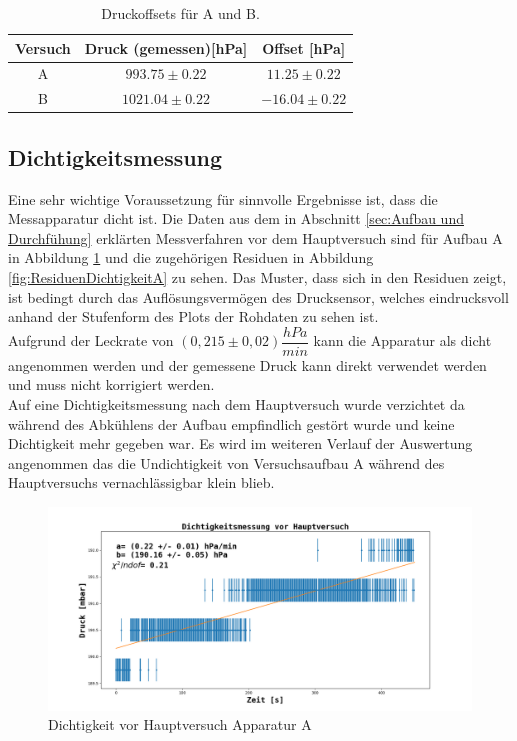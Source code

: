 \documentclass[12pt,a4paper]{article}
\begin{document}
\begin{table}
\begin{center}
\begin{tabular}{|c|c|c|}
\hline
Versuch & Druck (gemessen)[hPa] & Offset [hPa]\\
\hline
A & $993.75 \pm 0.22$ & $11.25 \pm 0.22$\\
\hline
B & $1021.04 \pm 0.22$ & $-16.04 \pm 0.22$\\
\hline
\end{tabular}
\end{center}
\caption[Offsets]{Druckoffsets für A und B.}
\label{tab:Druckoffsets}
\end{table}







\subsection{Dichtigkeitsmessung}
Eine sehr wichtige Voraussetzung für sinnvolle Ergebnisse ist, dass die Messapparatur dicht ist. Die Daten aus dem in Abschnitt \ref{sec:Aufbau und Durchfühung} erklärten Messverfahren vor dem Hauptversuch sind für Aufbau A in Abbildung \ref{fig:DichtigkeitA} und die zugehörigen Residuen in Abbildung \ref{fig:ResiduenDichtigkeitA} zu sehen. Das Muster, dass sich in den Residuen zeigt, ist bedingt durch das Auflösungsvermögen des Drucksensor, welches eindrucksvoll anhand der Stufenform des Plots der Rohdaten zu sehen ist. \\
Aufgrund der Leckrate von $(0,215 \pm 0,02) \dfrac{hPa}{min}$ kann die Apparatur als dicht angenommen werden und der gemessene Druck kann direkt verwendet werden und muss nicht korrigiert werden.\\
Auf eine Dichtigkeitsmessung nach dem Hauptversuch wurde verzichtet da während des Abkühlens der Aufbau empfindlich gestört wurde und keine Dichtigkeit mehr gegeben war. Es wird im weiteren Verlauf der Auswertung angenommen das die Undichtigkeit von Versuchsaufbau A während des Hauptversuchs vernachlässigbar klein blieb.

\begin{figure}
\includegraphics[width=\linewidth]{Bilder/Dichtigkeit_vorher_A.png}
\caption[Dichtigkeit vor Hauptversuch Apparatur A]{Dichtigkeit vor Hauptversuch Apparatur A}
\label{fig:DichtigkeitA}
\end{figure}
\end{document}
